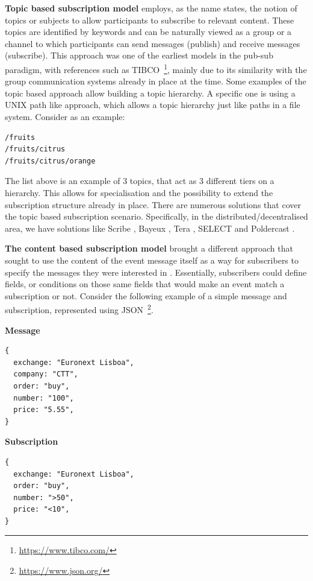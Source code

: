\textbf{Topic based subscription model} employs, as the name states, the
notion of topics or subjects to allow participants to subscribe to
relevant content. These topics are identified by keywords and can be
naturally viewed as a group or a channel to which participants can send
messages (publish) and receive messages (subscribe). This approach was
one of the earliest models in the pub-sub paradigm, with references
such as TIBCO~\footnote{\url{https://www.tibco.com/}}, mainly due to its similarity with the group
communication systems already in place at the time. Some examples of the
topic based approach allow building a topic hierarchy. A specific one is
using a UNIX path like approach, which allows a topic hierarchy
just like paths in a file system. Consider as an example:

\begin{verbatim}
/fruits
/fruits/citrus
/fruits/citrus/orange
\end{verbatim}

The list above is an example of 3 topics, that act as 3 different tiers on a
hierarchy. This allows for specialisation and the possibility to extend the
subscription structure already in place. There are numerous solutions that
cover the topic based subscription scenario. Specifically, in the
distributed/decentralised area, we have solutions like Scribe
\cite{Castro2002}, Bayeux \cite{Zhuang2001}, Tera \cite{Baldoni2007}, SELECT
\cite{Apolonia2018} and Poldercast \cite{Setty2012}.
\bigskip

\textbf{The content based subscription model} brought a different
approach that sought to use the content of the event message itself as a
way for subscribers to specify the messages they were interested in \cite{Banavar1999}.
Essentially, subscribers could define fields, or conditions on those same fields that would make an event
match a subscription or not. Consider the following example of a simple
message and subscription, represented using JSON~\footnote{\url{https://www.json.org/}}.
\bigskip

\textbf{Message}

\begin{verbatim}
{
  exchange: "Euronext Lisboa",
  company: "CTT",
  order: "buy",
  number: "100",
  price: "5.55",
}
\end{verbatim}

\textbf{Subscription}

\begin{verbatim}
{
  exchange: "Euronext Lisboa",
  order: "buy",
  number: ">50",
  price: "<10",
}
\end{verbatim}

